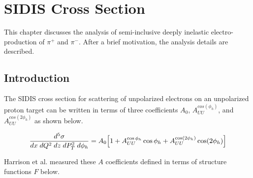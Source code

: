 %
%
%
%
%
 

\chapter{SIDIS Cross Section}
This chapter discusses the analysis of semi-inclusive deeply inelastic electro-production of $\pi^+$ and $\pi^-$.  After a brief motivation, the analysis details are described.  

\section{Introduction}
The SIDIS cross section for scattering of unpolarized electrons on an unpolarized proton target can be written in terms of three coefficients $A_{0}$, $A_{UU}^{cos(\phi_h)}$, and $A_{UU}^{cos(2\phi_h)}$ as shown below.  

\begin{equation}
	\frac{d^5\sigma}{dx \; dQ^2 \; dz \; dP_T^2 \; d\phi_h} = A_{0} \Bigl[ 1 + A_{UU}^{\cos\phi_h} \cos\phi_h + A_{UU}^{\cos(2\phi_h)} \cos(2\phi_h) \Bigr]
\end{equation}

Harrison et al. measured these $A$ coefficients defined in terms of structure functions $F$ below.  

